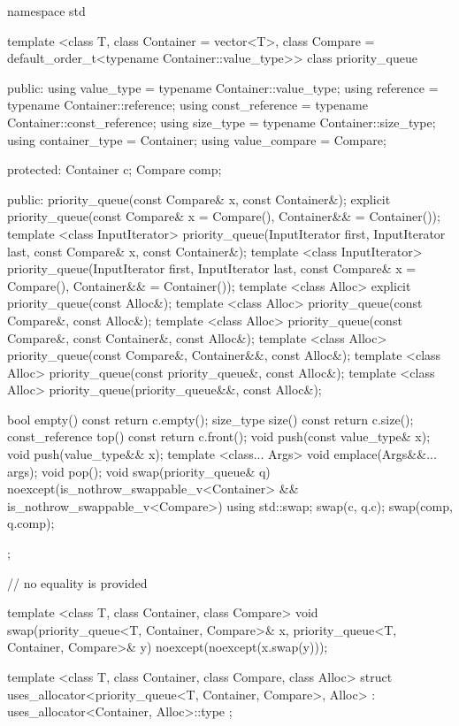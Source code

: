 \begin{codeblock}
namespace std {
  template <class T, class Container = vector<T>,
    class Compare = default_order_t<typename Container::value_type>>
  class priority_queue {
  public:
    using value_type      = typename Container::value_type;
    using reference       = typename Container::reference;
    using const_reference = typename Container::const_reference;
    using size_type       = typename Container::size_type;
    using container_type  = Container;
    using value_compare   = Compare;

  protected:
    Container c;
    Compare comp;

  public:
    priority_queue(const Compare& x, const Container&);
    explicit priority_queue(const Compare& x = Compare(), Container&& = Container());
    template <class InputIterator>
      priority_queue(InputIterator first, InputIterator last,
             const Compare& x, const Container&);
    template <class InputIterator>
      priority_queue(InputIterator first, InputIterator last,
             const Compare& x = Compare(), Container&& = Container());
    template <class Alloc> explicit priority_queue(const Alloc&);
    template <class Alloc> priority_queue(const Compare&, const Alloc&);
    template <class Alloc> priority_queue(const Compare&, const Container&, const Alloc&);
    template <class Alloc> priority_queue(const Compare&, Container&&, const Alloc&);
    template <class Alloc> priority_queue(const priority_queue&, const Alloc&);
    template <class Alloc> priority_queue(priority_queue&&, const Alloc&);

    bool      empty() const       { return c.empty(); }
    size_type size()  const       { return c.size(); }
    const_reference   top() const { return c.front(); }
    void push(const value_type& x);
    void push(value_type&& x);
    template <class... Args> void emplace(Args&&... args);
    void pop();
    void swap(priority_queue& q) noexcept(is_nothrow_swappable_v<Container> &&
                                          is_nothrow_swappable_v<Compare>)
      { using std::swap; swap(c, q.c); swap(comp, q.comp); }
  };

  // no equality is provided

  template <class T, class Container, class Compare>
    void swap(priority_queue<T, Container, Compare>& x,
              priority_queue<T, Container, Compare>& y) noexcept(noexcept(x.swap(y)));

  template <class T, class Container, class Compare, class Alloc>
    struct uses_allocator<priority_queue<T, Container, Compare>, Alloc>
      : uses_allocator<Container, Alloc>::type { };
}
\end{codeblock}

